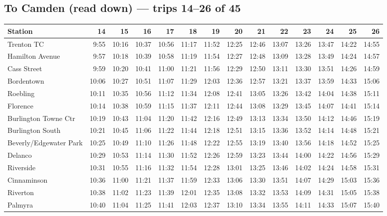 \subsection*{To Camden (read down) --- trips 14--26 of 45}
\begin{center}\footnotesize\setlength{\tabcolsep}{3pt}\begin{tabular}{@{}lrrrrrrrrrrrrr@{}}\toprule
Station & 14 & 15 & 16 & 17 & 18 & 19 & 20 & 21 & 22 & 23 & 24 & 25 & 26 \\\midrule
Trenton TC & 9:55 & 10:16 & 10:37 & 10:56 & 11:17 & 11:52 & 12:25 & 12:46 & 13:07 & 13:26 & 13:47 & 14:22 & 14:55 \\
Hamilton Avenue & 9:57 & 10:18 & 10:39 & 10:58 & 11:19 & 11:54 & 12:27 & 12:48 & 13:09 & 13:28 & 13:49 & 14:24 & 14:57 \\
Cass Street & 9:59 & 10:20 & 10:41 & 11:00 & 11:21 & 11:56 & 12:29 & 12:50 & 13:11 & 13:30 & 13:51 & 14:26 & 14:59 \\
Bordentown & 10:06 & 10:27 & 10:51 & 11:07 & 11:29 & 12:03 & 12:36 & 12:57 & 13:21 & 13:37 & 13:59 & 14:33 & 15:06 \\
Roebling & 10:11 & 10:35 & 10:56 & 11:12 & 11:34 & 12:08 & 12:41 & 13:05 & 13:26 & 13:42 & 14:04 & 14:38 & 15:11 \\
Florence & 10:14 & 10:38 & 10:59 & 11:15 & 11:37 & 12:11 & 12:44 & 13:08 & 13:29 & 13:45 & 14:07 & 14:41 & 15:14 \\
Burlington Towne Ctr & 10:19 & 10:43 & 11:04 & 11:20 & 11:42 & 12:16 & 12:49 & 13:13 & 13:34 & 13:50 & 14:12 & 14:46 & 15:19 \\
Burlington South & 10:21 & 10:45 & 11:06 & 11:22 & 11:44 & 12:18 & 12:51 & 13:15 & 13:36 & 13:52 & 14:14 & 14:48 & 15:21 \\
Beverly/Edgewater Park & 10:25 & 10:49 & 11:10 & 11:26 & 11:48 & 12:22 & 12:55 & 13:19 & 13:40 & 13:56 & 14:18 & 14:52 & 15:25 \\
Delanco & 10:29 & 10:53 & 11:14 & 11:30 & 11:52 & 12:26 & 12:59 & 13:23 & 13:44 & 14:00 & 14:22 & 14:56 & 15:29 \\
Riverside & 10:31 & 10:55 & 11:16 & 11:32 & 11:54 & 12:28 & 13:01 & 13:25 & 13:46 & 14:02 & 14:24 & 14:58 & 15:31 \\
Cinnaminson & 10:36 & 11:00 & 11:21 & 11:37 & 11:59 & 12:33 & 13:06 & 13:30 & 13:51 & 14:07 & 14:29 & 15:03 & 15:36 \\
Riverton & 10:38 & 11:02 & 11:23 & 11:39 & 12:01 & 12:35 & 13:08 & 13:32 & 13:53 & 14:09 & 14:31 & 15:05 & 15:38 \\
Palmyra & 10:40 & 11:04 & 11:25 & 11:41 & 12:03 & 12:37 & 13:10 & 13:34 & 13:55 & 14:11 & 14:33 & 15:07 & 15:40 \\

\end{tabular}
\end{center}

